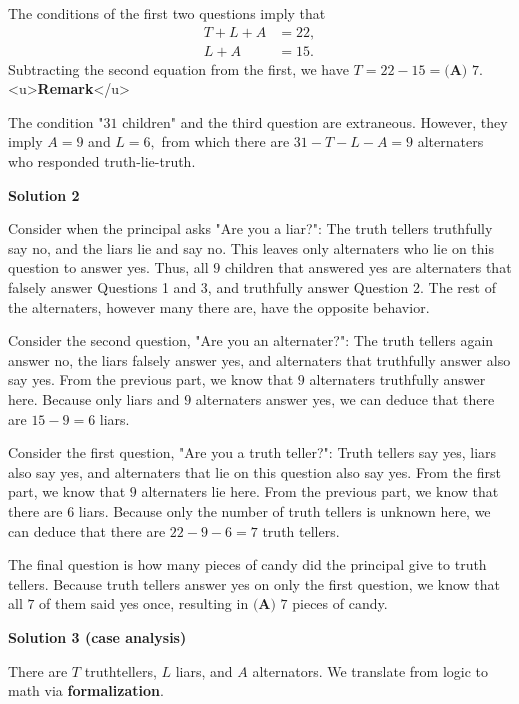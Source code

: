 \begin{enumerate}
 The conditions of the first two questions imply that
 \begin{align*} T+L+A&=22, \\ L+A&=15. \end{align*}
Subtracting the second equation from the first, we have $T=22-15=\boxed{\textbf{(A) } 7}.$
<u>\textbf{Remark}</u>

 The condition "$31$ children" and the third question are extraneous. However, they imply $A=9$ and $L=6,$ from which there are $31-T-L-A=9$ alternaters who responded truth-lie-truth.

 



\textbf{Solution 2}

Consider when the principal asks "Are you a liar?": The truth tellers truthfully say no, and the liars lie and say no. This leaves only alternaters who lie on this question to answer yes. Thus, all $9$ children that answered yes are alternaters that falsely answer Questions 1 and 3, and truthfully answer Question 2. The rest of the alternaters, however many there are, have the opposite behavior.

 Consider the second question, "Are you an alternater?": The truth tellers again answer no, the liars falsely answer yes, and alternaters that truthfully answer also say yes. From the previous part, we know that $9$ alternaters truthfully answer here. Because only liars and $9$ alternaters answer yes, we can deduce that there are $15-9=6$ liars.

 Consider the first question, "Are you a truth teller?": Truth tellers say yes, liars also say yes, and alternaters that lie on this question also say yes. From the first part, we know that $9$ alternaters lie here. From the previous part, we know that there are $6$ liars. Because only the number of truth tellers is unknown here, we can deduce that there are $22-9-6=7$ truth tellers.

 The final question is how many pieces of candy did the principal give to truth tellers. Because truth tellers answer yes on only the first question, we know that all $7$ of them said yes once, resulting in $\boxed{\textbf{(A) } 7}$ pieces of candy.

 


 



\textbf{Solution 3 (case analysis)}

There are $T$ truthtellers, $L$ liars, and $A$ alternators. We translate from logic to math via \textbf{formalization}.


\end{enumerate}
